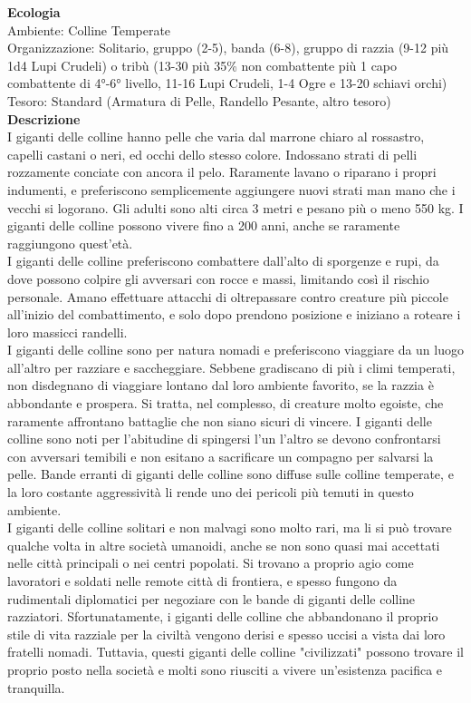 \begin{multicols}{2}
\textbf{Ecologia}\\
Ambiente: Colline Temperate\\
Organizzazione: Solitario, gruppo (2-5), banda (6-8), gruppo di razzia (9-12 più 1d4 Lupi Crudeli) o tribù (13-30 più 35\% non combattente più 1 capo combattente di 4°-6° livello, 11-16 Lupi Crudeli, 1-4 Ogre e 13-20 schiavi orchi)\\
Tesoro: Standard (Armatura di Pelle, Randello Pesante, altro tesoro)\\
\textbf{Descrizione}\\
I giganti delle colline hanno pelle che varia dal marrone chiaro al rossastro, capelli castani o neri, ed occhi dello stesso colore. Indossano strati di pelli rozzamente conciate con ancora il pelo. Raramente lavano o riparano i propri indumenti, e preferiscono semplicemente aggiungere nuovi strati man mano che i vecchi si logorano. Gli adulti sono alti circa 3 metri e pesano più o meno 550 kg. I giganti delle colline possono vivere fino a 200 anni, anche se raramente raggiungono quest'età.\\
I giganti delle colline preferiscono combattere dall'alto di sporgenze e rupi, da dove possono colpire gli avversari con rocce e massi, limitando così il rischio personale. Amano effettuare attacchi di oltrepassare contro creature più piccole all'inizio del combattimento, e solo dopo prendono posizione e iniziano a roteare i loro massicci randelli.\\
I giganti delle colline sono per natura nomadi e preferiscono viaggiare da un luogo all'altro per razziare e saccheggiare. Sebbene gradiscano di più i climi temperati, non disdegnano di viaggiare lontano dal loro ambiente favorito, se la razzia è abbondante e prospera. Si tratta, nel complesso, di creature molto egoiste, che raramente affrontano battaglie che non siano sicuri di vincere. I giganti delle colline sono noti per l'abitudine di spingersi l'un l'altro se devono confrontarsi con avversari temibili e non esitano a sacrificare un compagno per salvarsi la pelle. Bande erranti di giganti delle colline sono diffuse sulle colline temperate, e la loro costante aggressività li rende uno dei pericoli più temuti in questo ambiente.\\

I giganti delle colline solitari e non malvagi sono molto rari, ma li si può trovare qualche volta in altre società umanoidi, anche se non sono quasi mai accettati nelle città principali o nei centri popolati. Si trovano a proprio agio come lavoratori e soldati nelle remote città di frontiera, e spesso fungono da rudimentali diplomatici per negoziare con le bande di giganti delle colline razziatori. Sfortunatamente, i giganti delle colline che abbandonano il proprio stile di vita razziale per la civiltà vengono derisi e spesso uccisi a vista dai loro fratelli nomadi. Tuttavia, questi giganti delle colline "civilizzati" possono trovare il proprio posto nella società e molti sono riusciti a vivere un'esistenza pacifica e tranquilla.\\



\end{multicols}
